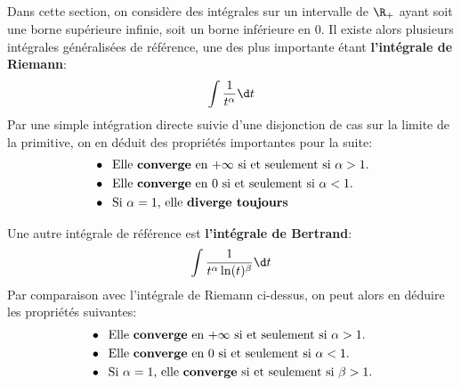 \subsection*{}
Dans cette section, on considère des intégrales sur un intervalle de \(\R_+\) ayant soit une borne supérieure infinie, soit un borne inférieure en 0.\+
Il existe alors plusieurs intégrales généralisées de référence, une des plus importante étant \textbf{l'intégrale de Riemann}:
\[
   \int \frac{1}{t^\alpha} \d t   
\]
Par une simple intégration directe suivie d'une disjonction de cas sur la limite de la primitive, on en déduit des propriétés importantes pour la suite:
\begin{align*}
   &\bullet \;\; \text{Elle \textbf{converge} en \(+\infty\) si et seulement si \(\alpha > 1\).} \\
   &\bullet \;\; \text{Elle \textbf{converge} en \(0\) si et seulement si \(\alpha < 1\).} \\
   &\bullet \;\; \text{Si \(\alpha = 1\), elle \textbf{diverge toujours}}
\end{align*}

Une autre intégrale de référence est \textbf{l'intégrale de Bertrand}:
\[
   \int \frac{1}{t^\alpha \ln(t)^\beta} \d t   
\]
Par comparaison avec l'intégrale de Riemann ci-dessus, on peut alors en déduire les propriétés suivantes:
\begin{align*}
   &\bullet \;\; \text{Elle \textbf{converge} en \(+\infty\) si et seulement si \(\alpha > 1\).} \\
   &\bullet \;\; \text{Elle \textbf{converge} en \(0\) si et seulement si \(\alpha < 1\).} \\
   &\bullet \;\; \text{Si \(\alpha = 1\), elle \textbf{converge} si et seulement si \(\beta > 1\).}
\end{align*}
